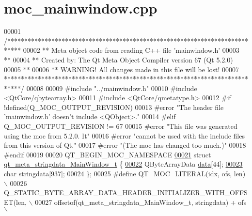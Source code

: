 \hypertarget{a00066_source}{\section{moc\+\_\+mainwindow.\+cpp}
\label{a00066_source}
}

\begin{DoxyCode}
00001 \textcolor{comment}{/****************************************************************************}
00002 \textcolor{comment}{** Meta object code from reading C++ file 'mainwindow.h'}
00003 \textcolor{comment}{**}
00004 \textcolor{comment}{** Created by: The Qt Meta Object Compiler version 67 (Qt 5.2.0)}
00005 \textcolor{comment}{**}
00006 \textcolor{comment}{** WARNING! All changes made in this file will be lost!}
00007 \textcolor{comment}{*****************************************************************************/}
00008 
00009 \textcolor{preprocessor}{#include "../mainwindow.h"}
00010 \textcolor{preprocessor}{#include <QtCore/qbytearray.h>}
00011 \textcolor{preprocessor}{#include <QtCore/qmetatype.h>}
00012 \textcolor{preprocessor}{#if !defined(Q\_MOC\_OUTPUT\_REVISION)}
00013 \textcolor{preprocessor}{#error "The header file 'mainwindow.h' doesn't include <QObject>."}
00014 \textcolor{preprocessor}{#elif Q\_MOC\_OUTPUT\_REVISION != 67}
00015 \textcolor{preprocessor}{#error "This file was generated using the moc from 5.2.0. It"}
00016 \textcolor{preprocessor}{#error "cannot be used with the include files from this version of Qt."}
00017 \textcolor{preprocessor}{#error "(The moc has changed too much.)"}
00018 \textcolor{preprocessor}{#endif}
00019 
00020 QT\_BEGIN\_MOC\_NAMESPACE
\hypertarget{a00066_source_l00021}{}\hyperlink{a00066}{00021} \textcolor{keyword}{struct }\hyperlink{a00066_da/deb/a00189}{qt\_meta\_stringdata\_MainWindow\_t} \{
\hypertarget{a00066_source_l00022}{}\hyperlink{a00066_a3d0c7851e40263cf43b0979ebc8eed83}{00022}     QByteArrayData \hyperlink{a00066_a3d0c7851e40263cf43b0979ebc8eed83}{data}[44];
\hypertarget{a00066_source_l00023}{}\hyperlink{a00066_aa581d4bebf76b40e9469596766315411}{00023}     \textcolor{keywordtype}{char} \hyperlink{a00066_aa581d4bebf76b40e9469596766315411}{stringdata}[937];
00024 \};
\hypertarget{a00066_source_l00025}{}\hyperlink{a00066_a75bb9482d242cde0a06c9dbdc6b83abe}{00025} \textcolor{preprocessor}{#define QT\_MOC\_LITERAL(idx, ofs, len) \(\backslash\)}
00026 \textcolor{preprocessor}{    Q\_STATIC\_BYTE\_ARRAY\_DATA\_HEADER\_INITIALIZER\_WITH\_OFFSET(len, \(\backslash\)}
00027 \textcolor{preprocessor}{    offsetof(qt\_meta\_stringdata\_MainWindow\_t, stringdata) + ofs \(\backslash\)}

\end{DoxyCode}
